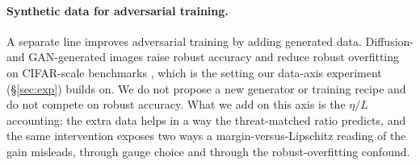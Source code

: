 \documentclass{article}
\theoremstyle{definition}
\begin{document}
\paragraph{Synthetic data for adversarial training.} A separate line improves adversarial training by adding generated data. Diffusion- and GAN-generated images raise robust accuracy and reduce robust overfitting on CIFAR-scale benchmarks \citep{gowal2021improving,rebuffi2021fixing,wang2023better}, which is the setting our data-axis experiment (\S\ref{sec:exp}) builds on. We do not propose a new generator or training recipe and do not compete on robust accuracy. What we add on this axis is the $\eta/L$ accounting: the extra data helps in a way the threat-matched ratio predicts, and the same intervention exposes two ways a margin-versus-Lipschitz reading of the gain misleads, through gauge choice and through the robust-overfitting confound.
\end{document}

